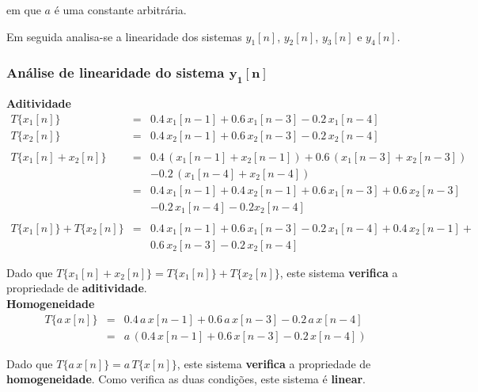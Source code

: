 \documentclass[a4paper]{article}
\begin{document}
\noindent em que $a$ é uma constante arbitrária.

\noindent Em seguida analisa-se a linearidade dos sistemas $y_{1}[n]$, $y_{2}[n]$, $y_{3}[n]$ e $y_{4}[n]$.

\subsubsection{Análise de linearidade do sistema $\mathbf{y_{1}[n]}$}
\label{subsubsec:liny1}
\noindent \textbf{Aditividade}
\begin{eqnarray}
	T\{x_{1}[n]\}					& = & 0.4 \, x_{1}[n - 1] + 0.6 \, x_{1}[n - 3] - 0.2 \, x_{1}[n - 4] \\
	T\{x_{2}[n]\}					& = & 0.4 \, x_{2}[n - 1] + 0.6 \, x_{2}[n - 3] - 0.2 \, x_{2}[n - 4] \\
	\nonumber \\
	T\{x_{1}[n] + x_{2}[n]\}		& = & 0.4 \, (x_{1}[n - 1] + x_{2}[n - 1]) + 0.6 \, (x_{1}[n - 3] + x_{2}[n - 3]) \nonumber \\ && - 0.2 \, (x_{1}[n - 4] + x_{2}[n - 4]) \\
									& = & 0.4 \, x_{1}[n - 1] + 0.4 \, x_{2}[n - 1] + 0.6 \, x_{1}[n - 3] + 0.6 \, x_{2}[n - 3] \nonumber \\ && - 0.2 \, x_{1}[n - 4] - 0.2 x_{2}[n - 4] \\
	\nonumber \\
	T\{x_{1}[n]\} + T\{x_{2}[n]\}	& = & 0.4 \, x_{1}[n - 1] + 0.6 \, x_{1}[n - 3] - 0.2 \, x_{1}[n - 4] + 0.4 \, x_{2}[n - 1] + \nonumber \\ && 0.6 \, x_{2}[n - 3] - 0.2 \, x_{2}[n - 4]
\end{eqnarray}

\noindent Dado que $T\{x_{1}[n] + x_{2}[n]\} = T\{x_{1}[n]\} + T\{x_{2}[n]\}$, este sistema \textbf{verifica} a propriedade de \textbf{aditividade}. \\

\noindent \textbf{Homogeneidade}
\begin{eqnarray}
	T\{a \, x[n]\}					& = & 0.4 \, a \, x[n - 1] + 0.6 \, a \, x[n - 3] - 0.2 \, a \, x[n - 4] \\
									& = & a \, (0.4 \, x[n - 1] + 0.6 \, x[n - 3] - 0.2 \, x[n - 4])
\end{eqnarray}

\noindent Dado que $T\{a \, x[n]\} = a \, T\{x[n]\}$, este sistema \textbf{verifica} a propriedade de \textbf{homogeneidade}. Como verifica as duas condições, este sistema é \textbf{linear}.
\end{document}
